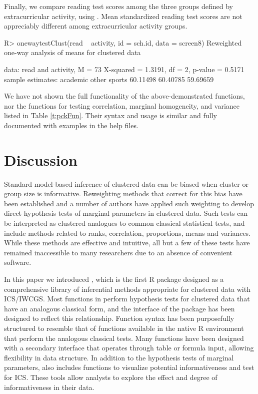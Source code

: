 Finally, we compare reading test scores among the three groups defined by extracurricular activity, using . Mean standardized reading test scores are not appreciably different among extracurricular activity groups.
\begin{example}	
	R> onewaytestClust(read ~ activity, id = sch.id, data = screen8)
	Reweighted one-way analysis of means for clustered data
	
	data:  read and activity, M = 73
	X-squared = 1.3191, df = 2, p-value = 0.5171
	sample estimates:
	academic    other   sports 
	60.11498 60.40785 59.69659
\end{example}
We have not shown the full functionality of the above-demonstrated functions, nor the  functions for testing correlation, marginal homogeneity, and variance listed in Table \ref{t:pckFun}. Their syntax and usage is similar and fully documented with examples in the help files.



\section{Discussion} \label{sec:summary}
Standard model-based inference of clustered data can be biased when cluster or group size is informative. Reweighting methods that correct for this bias have been established and a number of authors have applied such weighting to develop direct hypothesis tests of marginal parameters in clustered data. Such tests can be interpreted as clustered analogues to common classical statistical tests, and include methods related to ranks, correlation, proportions, means and variances. While these methods are effective and intuitive, all but a few of these tests have remained inaccessible to many researchers due to an absence of convenient software.

In this paper we introduced , which is the first R package designed as a comprehensive library of inferential methods appropriate for clustered data with ICS/IWCGS. Most functions in  perform hypothesis tests for clustered data that have an analogous classical form, and the interface of the package has been designed to reflect this relationship. Function syntax has been purposefully structured to resemble that of functions available in the native R environment that perform the analogous classical tests. Many functions have been designed with a secondary interface that operates through table or formula input, allowing flexibility in data structure. In addition to the hypothesis tests of marginal parameters,  also includes functions to visualize potential informativeness and test for ICS. These tools allow analysts to explore the effect and degree of informativeness in their data. 

